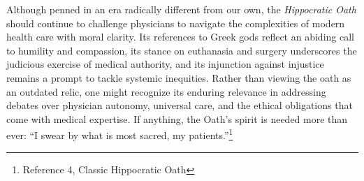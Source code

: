 \documentclass[12pt]{article}
\begin{document}
\bigskip

Although penned in an era radically different from our own, the \textit{Hippocratic Oath} should continue to challenge 
physicians to navigate the complexities of modern health care with moral clarity. 
Its references to Greek gods reflect an abiding call to humility and compassion, its stance on euthanasia and surgery underscores the 
judicious exercise of medical authority, and its injunction against injustice remains a prompt to tackle systemic inequities. 
Rather than viewing the oath as an outdated relic, one might recognize its enduring relevance in addressing debates over physician autonomy, 
universal care, and the ethical obligations that come with medical expertise. 
If anything, the Oath’s spirit is needed more than ever: “I swear by what is most sacred, my patients.”\footnote{Reference 4, Classic Hippocratic Oath}

\bigskip
\end{document}
